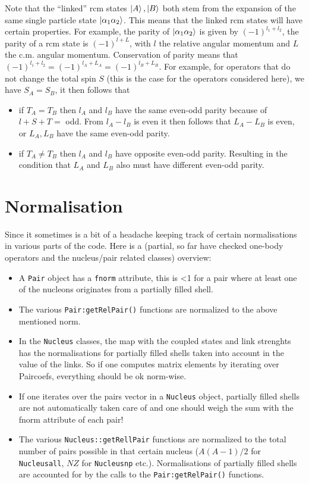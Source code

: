 \documentclass[10pt]{article}
\begin{document}
Note that the ``linked'' rcm states $\ket{A},\ket{B}$ both stem from the 
expansion of the same single particle state $\ket{ \alpha_1 \alpha_2}$.
This means that the linked rcm states will have certain properties.
For example, the parity of $\ket{ \alpha_1 \alpha_2}$ is given by $(-1)^{l_1 + l_2}$, the parity of a rcm state is $(-1)^{l+L}$, with $l$ the relative angular momentum and $L$ the c.m. angular momentum.
Conservation of parity means that $(-1)^{l_1 + l_2} = (-1)^{l_A + L_A} = (-1)^{l_B + L_B}$.
For example, for operators that do not change the total spin $S$ (this is the case for the operators considered here), we have $S_A = S_B$, it then follows that
\begin{itemize}
	\item if $T_A=T_B$ then $l_A$ and $l_B$ have the same even-odd parity because of $l+S+T=$ odd.
	From $l_A - l_B$ is even it then follows that $L_A - L_B$ is even, or $L_A,L_B$ have the same even-odd parity.
	\item if $T_A \neq T_B$ then $l_A$ and $l_B$ have opposite even-odd parity. Resulting in the condition that $L_A$ and $L_B$ also must have different even-odd parity. 
\end{itemize}
\section{Normalisation}
Since it sometimes is a bit of a headache keeping track of certain 
normalisations in various parts of the code.  Here is a (partial, so far have 
checked one-body operators and the nucleus/pair related classes) overview:
\begin{itemize}
 \item A \texttt{Pair} object has a \texttt{fnorm} attribute, this is <1 
for a pair where at least one of the nucleons originates from a partially 
filled shell.
\item The various \texttt{Pair:getRelPair()} functions are normalized to the 
above mentioned norm.
\item In the \texttt{Nucleus} classes, the map with the coupled states and link 
strenghts has the normalisations for partially filled shells taken into account 
in the value of the links.  So if one computes matrix elements by iterating 
over Paircoefs, everything should be ok norm-wise.
\item If one iterates over the pairs vector in a \texttt{Nucleus} object, 
partially filled shells are not automatically taken care of and one should 
weigh the sum with the fnorm attribute of each pair!
\item The various \texttt{Nucleus::getRellPair} functions are normalized to the 
total number of pairs possible in that certain nucleus ($A(A-1)/2$ for 
\texttt{Nucleusall}, $NZ$ for \texttt{Nucleusnp} etc.).  Normalisations of 
partially filled shells are accounted for by the calls to the 
\texttt{Pair:getRelPair()} functions.
\end{itemize}
\end{document}
